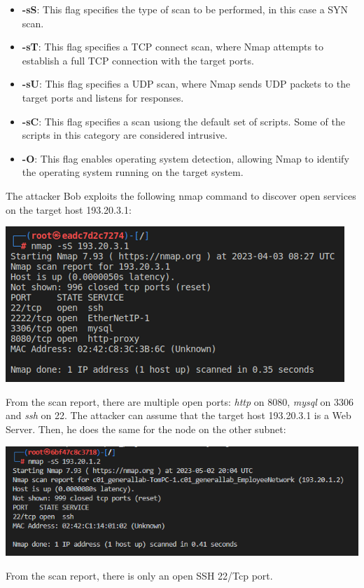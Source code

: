 \documentclass[a4paper, 12pt, oneside]{extbook}
\begin{document}
\begin{itemize}
  \item \textbf{-sS}: This flag specifies the type of scan to be performed, in this case a SYN scan.
  \item \textbf{-sT}: This flag specifies a TCP connect scan, where Nmap attempts to establish a full TCP connection with the target ports.
  \item \textbf{-sU}: This flag specifies a UDP scan, where Nmap sends UDP packets to the target ports and listens for responses.
  \item \textbf{-sC}: This flag specifies a scan usiong the default set of scripts. Some of the scripts in this category are considered intrusive.
  \item \textbf{-O}: This flag enables operating system detection, allowing Nmap to identify the operating system running on the target system.
\end{itemize}
The attacker Bob exploits the following nmap command to discover open services on the target host 193.20.3.1:
\begin{center}
  \includegraphics[scale=0.76]{../Image/scanning_company_ss.PNG}
\end{center}
From the scan report, there are multiple open ports: \textit{http} on 8080, \textit{mysql} on 3306 and \textit{ssh} on 22. The attacker can assume that the target host 193.20.3.1 is a Web Server.
\newline Then, he does the same for the node on the other subnet:
\begin{center}
  \includegraphics[scale=0.76]{../Image/scanning_employee_ss.PNG}
\end{center}
From the scan report, there is only an open SSH 22/Tcp port.
\end{document}
